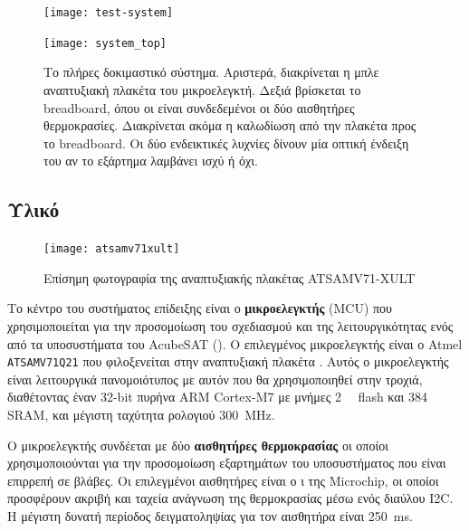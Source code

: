 \documentclass[a4paper,nobib]{tufte-book}
\begin{document}
\begin{figure}
	\texttt{[image: test-system]}\par
	\vspace*{3ex}
	\texttt{[image: system\_top]}
	\caption{Το πλήρες δοκιμαστικό σύστημα. Αριστερά, διακρίνεται η μπλε αναπτυξιακή πλακέτα του μικροελεγκτή. Δεξιά βρίσκεται το breadboard, όπου οι είναι συνδεδεμένοι οι δύο αισθητήρες θερμοκρασίες. Διακρίνεται ακόμα η καλωδίωση από την πλακέτα προς το breadboard. Οι δύο ενδεικτικές λυχνίες δίνουν μία οπτική ένδειξη του αν το εξάρτημα λαμβάνει ισχύ ή όχι.}
\end{figure}

\subsection{Υλικό}

\begin{figure}
	\centering
	\texttt{[image: atsamv71xult]}
	\caption{Επίσημη φωτογραφία της αναπτυξιακής πλακέτας ATSAMV71-XULT}
\end{figure}

Το κέντρο του συστήματος επίδειξης είναι ο \textbf{μικροελεγκτής} (\ac{MCU}) που χρησιμοποιείται για την προσομοίωση του σχεδιασμού και της λειτουργικότητας ενός από τα υποσυστήματα του AcubeSAT (). Ο επιλεγμένος μικροελεγκτής είναι ο Atmel \texttt{ATSAMV71Q21} που φιλοξενείται στην αναπτυξιακή πλακέτα . Αυτός ο μικροελεγκτής είναι λειτουργικά πανομοιότυπος με αυτόν που θα χρησιμοποιηθεί στην τροχιά, διαθέτοντας έναν 32-bit πυρήνα ARM Cortex-M7 με μνήμες \SI{2}{\mebi\byte} flash και \SI{384}{\kibi\byte} \acs{SRAM}, και μέγιστη ταχύτητα ρολογιού \SI{300}{\mega\hertz}.

Ο μικροελεγκτής συνδέεται με δύο \textbf{αισθητήρες θερμοκρασίας} οι οποίοι χρησιμοποιούνται για την προσομοίωση εξαρτημάτων του υποσυστήματος που είναι επιρρεπή σε βλάβες. Οι επιλεγμένοι αισθητήρες είναι ο ι της Microchip, οι οποίοι προσφέρουν ακριβή και ταχεία ανάγνωση της θερμοκρασίας μέσω ενός διαύλου \ac{I2C}. Η μέγιστη δυνατή περίοδος δειγματοληψίας για τον αισθητήρα είναι \SI{250}{\milli\second}.

\end{document}
